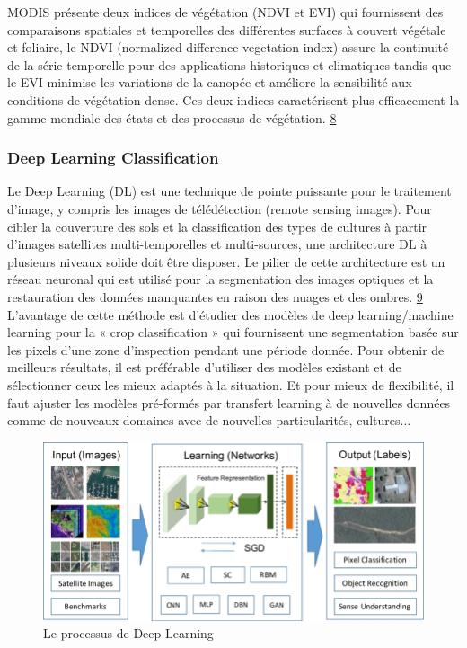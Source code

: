 \documentclass[12pt, openany]{report}
\begin{document}
MODIS présente deux indices de végétation (NDVI et EVI) qui fournissent des comparaisons spatiales et temporelles des différentes surfaces à couvert végétale et foliaire, le NDVI (normalized difference vegetation index) assure la continuité de la série temporelle pour des applications historiques et climatiques tandis que le EVI minimise les variations de la canopée et améliore la sensibilité aux conditions de végétation dense.
Ces deux indices caractérisent plus efficacement la gamme mondiale des états et des processus de végétation. \hyperref[sec:refs]{8}


\subsubsection{Deep Learning Classification}
Le Deep Learning (DL) est une technique de pointe puissante pour le traitement d'image, y compris les images de télédétection (remote sensing images). 
Pour cibler la couverture des sols et la classification des types de cultures à partir d'images satellites multi-temporelles et multi-sources, une architecture DL à plusieurs niveaux solide doit être disposer. 
Le pilier de cette architecture est un réseau neuronal qui est utilisé pour la segmentation des images optiques et la restauration des données manquantes en raison des nuages et des ombres. \hyperref[sec:refs]{9} \\

L’avantage de cette méthode est d’étudier des modèles de deep learning/machine learning pour la « crop classification » qui fournissent une segmentation basée sur les pixels d'une zone d'inspection pendant une période donnée. Pour obtenir de meilleurs résultats, il est préférable d’utiliser des modèles existant et de sélectionner ceux les mieux adaptés à la situation. Et pour mieux de flexibilité, il faut ajuster les modèles pré-formés par transfert learning à de nouvelles données comme de nouveaux domaines avec de nouvelles particularités, cultures...\\

\begin{figure}[hp]
\centering
\includegraphics[scale=0.5]{deep.png}
\caption{Le processus de Deep Learning}
\end{figure}
\end{document}
